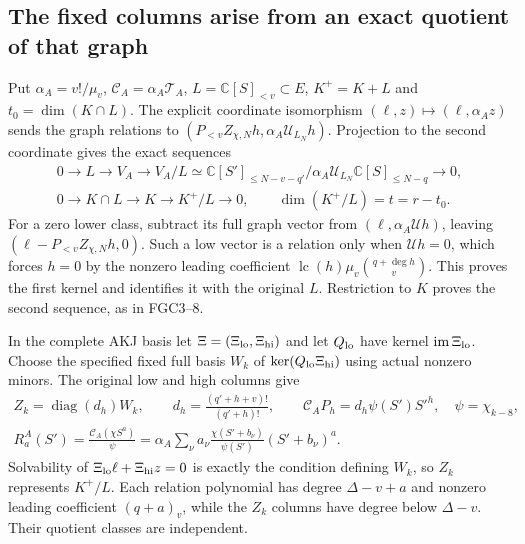 \documentclass[11pt,a4paper]{article}
\begin{document}
\subsection{The fixed columns arise from an exact quotient of that graph}

Put $\alpha_A=v!/\mu_v$, $\mathcal C_A=\alpha_A\mathcal T_A$,
$L=\mathbb C[S]_{<v}\subset E$, $K^+=K+L$ and
$t_0=\dim(K\cap L)$. The explicit coordinate isomorphism
$(\ell,z)\mapsto(\ell,\alpha_Az)$ sends the graph relations to
$(P_{<v}Z_{\chi,N}h,\alpha_A\mathcal U_{L_N}h)$.
Projection to the second coordinate gives the exact sequences
\[
\begin{gathered}
 0\longrightarrow L\longrightarrow V_A
   \longrightarrow V_A/L
   \simeq\mathbb C[S']_{\le N-v-q'}/
                 \alpha_A\mathcal U_{L_N}\mathbb C[S]_{\le N-q}
   \longrightarrow0,\\
 0\longrightarrow K\cap L\longrightarrow K
       \longrightarrow K^+/L\longrightarrow0,\qquad
 \dim(K^+/L)=t=r-t_0 .
\end{gathered}\tag{OER7}
\]
For a zero lower class, subtract its full graph vector from
$(\ell,\alpha_A\mathcal U h)$, leaving
$(\ell-P_{<v}Z_{\chi,N}h,0)$. Such a low vector is a relation
only when $\mathcal U h=0$, which forces $h=0$ by the nonzero
leading coefficient
$\operatorname{lc}(h)\mu_v\binom{q+\deg h}{v}$.
This proves the first kernel and identifies it with the original
$L$. Restriction to $K$ proves the second sequence, as in FGC3--8.

In the complete AKJ basis let $\Xi=(\Xi_{\rm lo},\Xi_{\rm hi})$
and let $Q_{\rm lo}$ have kernel $\operatorname{im}\Xi_{\rm lo}$.
Choose the specified fixed full basis $W_k$ of
$\ker(Q_{\rm lo}\Xi_{\rm hi})$ using actual nonzero minors.
The original low and high columns give
\[
\begin{gathered}
 Z_k=\operatorname{diag}(d_h)W_k,\qquad
 d_h=\frac{(q'+h+v)!}{(q'+h)!},\qquad
 \mathcal C_AP_h=d_h\psi(S')S'^h,\quad\psi=\chi_{k-8},\\
 R_a^A(S')=\frac{\mathcal C_A(\chi S^a)}{\psi}
      =\alpha_A\sum_\nu a_\nu
             \frac{\chi(S'+b_\nu)}{\psi(S')}(S'+b_\nu)^a .
\end{gathered}\tag{OER8}
\]
Solvability of $\Xi_{\rm lo}\ell+\Xi_{\rm hi}z=0$ is exactly
the condition defining $W_k$, so $Z_k$ represents $K^+/L$.
Each relation polynomial has degree $\Delta-v+a$ and nonzero
leading coefficient $(q+a)_v$, while the $Z_k$ columns have
degree below $\Delta-v$. Their quotient classes are independent.
\end{document}
